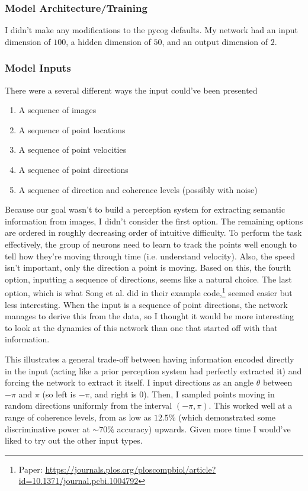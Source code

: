 \documentclass[11pt]{article}
\renewcommand{\_}[1]{\underline{ #1 }}
\theoremstyle{definition}
\begin{document}
\subsubsection{Model Architecture/Training}

I didn't make any modifications to the pycog defaults. My network had an input dimension of $100$, a hidden dimension of $50$, and an output dimension of $2$.

\subsubsection{Model Inputs}

There were a several different ways the input could've been presented
\begin{enumerate}
  \item A sequence of images
  \item A sequence of point locations
  \item A sequence of point velocities
  \item A sequence of point directions
  \item A sequence of direction and coherence levels (possibly with noise)
\end{enumerate}

Because our goal wasn't to build a perception system for extracting semantic information from images, I didn't consider the first option. The remaining options are ordered in roughly decreasing order of intuitive difficulty. To perform the task effectively, the group of neurons need to learn to track the points well enough to tell how they're moving through time (i.e. understand velocity). Also, the speed isn't important, only the direction a point is moving. Based on this, the fourth option, inputting a sequence of directions, seems like a natural choice. The last option, which is what Song et al. did in their example code,\footnote{Paper: \url{https://journals.plos.org/ploscompbiol/article?id=10.1371/journal.pcbi.1004792}} seemed easier but less interesting. When the input is a sequence of point directions, the network manages to derive this from the data, so I thought it would be more interesting to look at the dynamics of this network than one that started off with that information.

This illustrates a general trade-off between having information encoded directly in the input (acting like a prior perception system had perfectly extracted it) and forcing the network to extract it itself. I input directions as an angle $\theta$ between $-\pi$ and $\pi$ (so left is $-\pi$, and right is $0$). Then, I sampled points moving in random directions uniformly from the interval $(-\pi, \pi)$. This worked well at a range of coherence levels, from as low as $12.5\%$ (which demonstrated some discriminative power at $\sim 70\%$ accuracy) upwards. Given more time I would've liked to try out the other input types.
\end{document}
